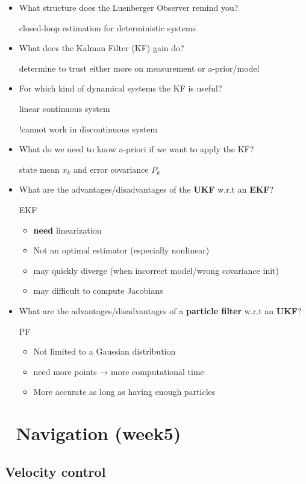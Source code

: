 \documentclass[]{article}
\begin{document}
\begin{itemize}
\item
  What structure does the Luenberger Observer remind you?

  closed-loop estimation for deterministic systems
\item
  What does the Kalman Filter (KF) gain do?

  determine to trust either more on measurement or a-prior/model
\item
  For which kind of dynamical systems the KF is useful?

  linear continuous system

  !cannot work in discontinuous system
\item
  What do we need to know a-priori if we want to apply the KF?

  state mean \(x_k\) and error covariance \(P_k\)
\item
  What are the advantages/disadvantages of the \textbf{UKF} w.r.t an
  \textbf{EKF}?

  EKF

  \begin{itemize}
  \item
    \textbf{need} linearization
  \item
    Not an optimal estimator (especially nonlinear)
  \item
    may quickly diverge (when incorrect model/wrong covariance init)
  \item
    may difficult to compute Jacobians
  \end{itemize}
\item
  What are the advantages/disadvantages of a \textbf{particle filter}
  w.r.t an \textbf{UKF}?

  PF

  \begin{itemize}
  \item
    Not limited to a Gaussian distribution
  \item
    need more points → more computational time
  \item
    More accurate as long as having enough particles
  \end{itemize}
\end{itemize}

\section{🚧 Navigation (week5)}\label{header-n1059}

\subsection{Velocity control}\label{header-n1060}
\end{document}
